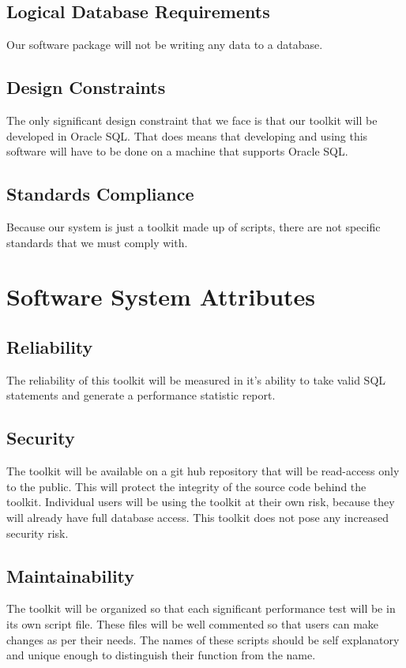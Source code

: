 \documentclass[draftclsnofoot, onecolumn, compsoc, 10pt]{IEEEtran}
\begin{document}
\subsection{Logical Database Requirements}
Our software package will not be writing any data to a database.

\subsection{Design Constraints}
The only significant design constraint that we face is that our toolkit will be developed in Oracle SQL. 
That does means that  developing and using this software will have to be done on a machine that supports Oracle SQL.

\subsection{Standards Compliance}
Because our system is just a toolkit made up of scripts, there are not specific standards that we must comply with. 

\section{Software System Attributes}

\subsection{Reliability}
The reliability of this toolkit will be measured in it's ability to take valid SQL statements and generate a performance statistic report. 

\subsection{Security}
The toolkit will be available on a git hub repository that will be read-access only to the public. 
This will protect the integrity of the source code behind the toolkit. 
Individual users will be using the toolkit at their own risk, because they will already have full database access.
This toolkit does not pose any increased security risk. 

\subsection{Maintainability}
The toolkit will be organized so that each significant performance test will be in its own script file. 
These files will be well commented so that users can make changes as per their needs. 
The names of these scripts should be self explanatory and unique enough to distinguish their function from the name. 
\end{document}
